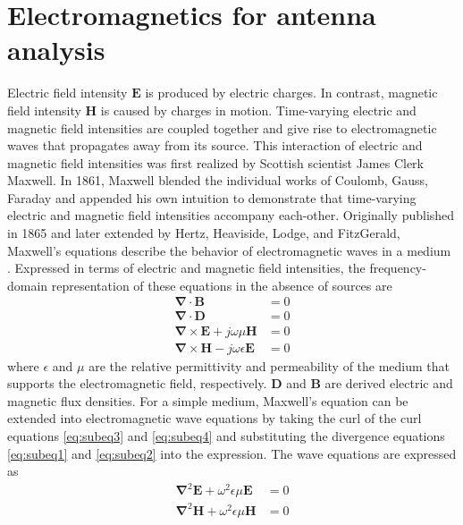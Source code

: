 \section{Electromagnetics for antenna analysis}
Electric field intensity $\mathbf{E}$ is produced by electric charges. In contrast, magnetic field intensity $\mathbf{H}$ is caused by charges in motion. Time-varying electric and magnetic field intensities are coupled together and give rise to electromagnetic waves that propagates away from its source. This interaction of electric and magnetic field intensities was first realized by Scottish scientist James Clerk Maxwell. In 1861, Maxwell blended the individual works of Coulomb, Gauss, Faraday and appended his own intuition to demonstrate that time-varying electric and magnetic field intensities accompany each-other. Originally published in 1865 and later extended by Hertz, Heaviside, Lodge, and FitzGerald, Maxwell's equations describe the behavior of electromagnetic waves in a medium \cite{hunt2005}. Expressed in terms of electric and magnetic field intensities, the frequency-domain representation of these equations in the absence of sources are
%
\begin{subequations}
\begin{align}
\mathbf{\nabla} \cdot \mathbf{B}    &= 0 \label{eq:subeq1}\\ 
\mathbf{\nabla} \cdot \mathbf{D}    &= 0 \label{eq:subeq2}\\
\mathbf{\nabla} \times \mathbf{E} + j \omega \mu \mathbf{H} &= 0 \label{eq:subeq3}\\
\mathbf{\nabla} \times \mathbf{H} - j \omega \epsilon \mathbf{E} &= 0 \label{eq:subeq4}
\end{align} 
\end{subequations}
%
where $\epsilon$ and $\mu$ are the relative permittivity and permeability of the medium that supports the electromagnetic field, respectively. $\mathbf{D}$ and $\mathbf{B}$ are derived electric and magnetic flux densities. For a simple medium, Maxwell's equation can be extended into electromagnetic wave equations by taking the curl of the curl equations \ref{eq:subeq3} and \ref{eq:subeq4} and substituting the divergence equations \ref{eq:subeq1} and \ref{eq:subeq2} into the expression. The wave equations are expressed as
%
\begin{subequations}
\begin{align}
\mathbf{\nabla}^2 \mathbf{E} + \omega ^2 \epsilon \mu \mathbf{E}    &= 0 \label{eq:subeqb1} \\ 
\mathbf{\nabla}^2 \mathbf{H} + \omega ^2 \epsilon \mu \mathbf{H}    &= 0 
\end{align} 
\end{subequations}
